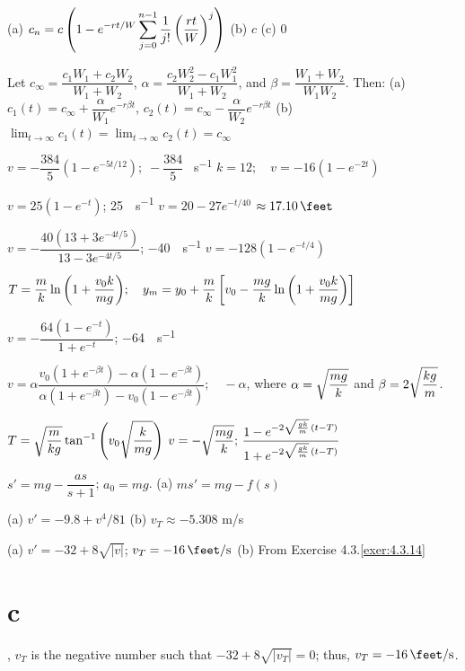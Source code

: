 (a) $\displaystyle{c_n=c\left(1-e^{-rt/W}\sum_{j=0}^{n-1}\frac{1}{j!}\left(\frac{rt}{W}\right)^j\right)}$
(b) $c$  (c)  $0$

Let $c_\infty=\dfrac{c_1W_1+c_2W_2}{W_1+W_2}$,
$\alpha=\dfrac{c_2W_2^2-c_1W_1^2}{W_1+W_2}$, and
$\beta=\dfrac{W_1+W_2}{W_1W_2}$. Then:
 (a) $c_1(t)=c_\infty+\dfrac{\alpha}{W_1}e^{-r\beta t}$,
 $c_2(t)=c_\infty-\dfrac{\alpha}{W_2}e^{-r\beta t}$
 (b)
$\lim_{t\to\infty}c_1(t)=\lim_{t\to\infty}c_2(t)=c_\infty$

\medskip


 $v=-\dfrac{384}{5}\left(1-e^{-5t/12}\right);\;
-\dfrac{384}{5}$ \unit{\feet\per\second}
 $k=12;   \quad v=-16(1-e^{-2t})$

  $v=25(1-e^{-t})$;   \qty{25}{\feet\per\second}
  $v=20-27e^{-t/40}$
  $\approx \qty{17.10}{\feet}$

 $v=-\dfrac{40(13+3e^{-4t/5})}{13-3e^{-4t/5}}$;   \qty{-40}{\feet\per\second}
  $v=-128(1-e^{-t/4})$

$T=\displaystyle{\frac{m}{k}\ln\left(1+\frac{v_0k}{mg}
\right)};   \quad y_m=y_0+\displaystyle{\frac{m}{k}\left[v_0-\frac{mg}{k}\ln\left(1+\frac{v_0k}{mg}\right)\right]}$

  $v=-\dfrac{64(1-e^{-t})}{1+e^{-t}}$;
\qty{-64}{\feet\per\second}

$v=\alpha\dfrac{v_0(1+e^{-\beta t})-\alpha(1-e^{-\beta
t})}{\alpha(1+e^{-\beta t})-v_0(1-e^{-\beta t})};  \quad-\alpha$,
where $\alpha=\displaystyle{\sqrt{\frac{mg}{k}}}$ and
$\beta=2\displaystyle{\sqrt{\frac{kg}{m}}}$.

$\displaystyle{T=\sqrt{\frac{m}{kg}}
\tan^{-1}\left(v_0 \sqrt{\frac{k}{mg}}\right)}$
$v=-\displaystyle{\sqrt{\frac{mg}{k}}; \,
\frac{1-e^{-2\sqrt{\frac{gk}{m}}\, (t-T)}}{{1+e^{-2\sqrt{\frac{gk}{m}}\,
(t-T)}}}}$

$s'=mg-\dfrac{as}{s+1}$;   $a_0=mg$.
 (a) $ms'=mg-f(s)$

(a) $v'=-9.8+v^4/81$   (b)
$v_T\approx-5.308$ m/s

(a) $v'=-32+8\sqrt{|v|}$;\;  $v_T=\qty{-16}{\feet\per\second}$
(b) From {Exercise 4.3.\ref{exer:4.3.14}}\part{c},
$v_T$ is the
negative number such that $-32+8\sqrt{|v_T|}=0$; thus,
$v_T=\qty{-16}{\feet\per\second}$.

